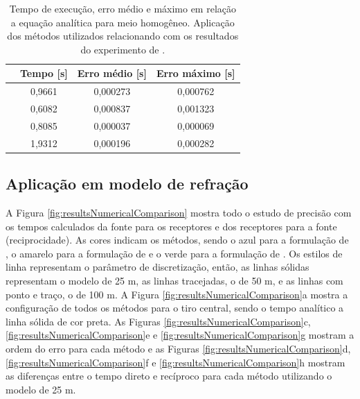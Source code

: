 \begin{table}[H]
	\caption{Tempo de execução, erro médio e máximo em relação a equação analítica para meio homogêneo. Aplicação dos métodos utilizados relacionando com os resultados do experimento de .}
	\begin{tabular}{r|ccc}
		\multicolumn{1}{c|}{} & Tempo {[}s{]} & Erro médio {[}s{]} & Erro máximo {[}s{]} \\ \hline
		\citeonline{podvin1991finite} & 0,9661        & 0,000273           & 0,000762            \\ \hline
		\citeonline{jeong2008fast}    & 0,6082        & 0,000837           & 0,001323            \\ \hline
		\citeonline{noble2014accurate}& 0,8085        & 0,000037           & 0,000069            \\ \hline
		\citeonline{cai2023improved}  & 1,9312        & 0,000196           & 0,000282           
	\end{tabular}
	\label{table_homog}
\end{table}

\subsection{Aplicação em modelo de refração}

A Figura \ref{fig:resultsNumericalComparison} mostra todo o estudo de precisão com os tempos calculados da fonte para os receptores e dos receptores para a fonte (reciprocidade). As cores indicam os métodos, sendo o azul para a formulação de , o amarelo para a formulação de  e o verde para a formulação de . Os estilos de linha representam o parâmetro de discretização, então, as linhas sólidas representam o modelo de 25 m, as linhas tracejadas, o de 50 m, e as linhas com ponto e traço, o de 100 m. A Figura \ref{fig:resultsNumericalComparison}a mostra a configuração de todos os métodos para o tiro central, sendo o tempo analítico a linha sólida de cor preta. As Figuras \ref{fig:resultsNumericalComparison}c, \ref{fig:resultsNumericalComparison}e e \ref{fig:resultsNumericalComparison}g mostram a ordem do erro para cada método e as Figuras \ref{fig:resultsNumericalComparison}d, \ref{fig:resultsNumericalComparison}f e \ref{fig:resultsNumericalComparison}h mostram as diferenças entre o tempo direto e recíproco para cada método utilizando o modelo de 25 m.  

